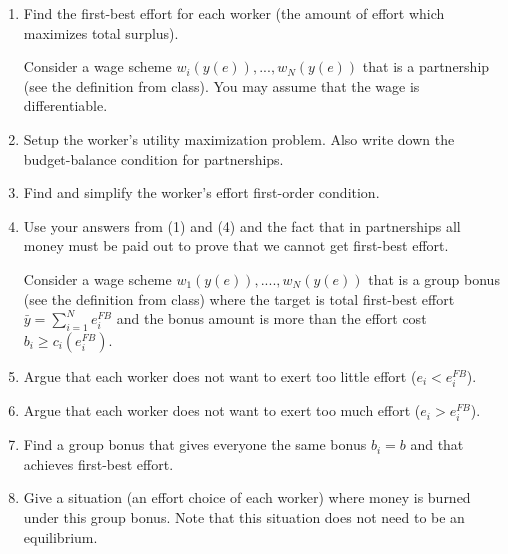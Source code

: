 \documentclass{article}
\begin{document}
\begin{enumerate}
    \item Find the first-best effort for each worker (the amount of effort which maximizes total surplus).

 Consider a wage scheme $w_i(y(e)), ...,w_N(y(e))$ that is a partnership (see the definition from class). You may assume that the wage is differentiable.

    
    \item  Setup the worker's utility maximization problem. Also write down the budget-balance condition for partnerships.
    \item Find and simplify the worker's effort first-order condition.
    \item Use your answers from (1) and (4) and the fact that in partnerships all money must be paid out to prove that we cannot get first-best effort.

  Consider a wage scheme  $w_1(y(e)),...., w_N(y(e))$ that is a group bonus (see the definition from class) where the target is total first-best effort $\bar y = \sum_{i=1}^N e_i^{FB}$ and the bonus amount is more than the effort cost $b_i\geq c_i(e_i^{FB})$.

    \item Argue that each worker does not want to exert too little effort ($e_i<e_i^{FB}$).

    \item Argue that each worker does not want to exert too much effort ($e_i>e_i^{FB}$).

    \item Find a group bonus that gives everyone the same bonus $b_i=b$ and that achieves first-best effort.

 \item Give a situation (an effort choice of each worker) where money is burned under this group bonus. Note that this situation does not need to be an equilibrium.



 

    

    
\end{enumerate}
\end{document}

